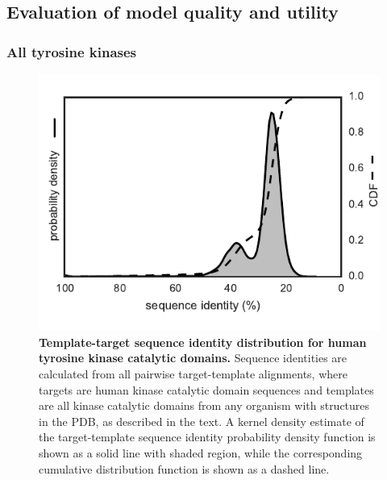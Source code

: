 \documentclass[aps,pre,twocolumn,nofootinbib,superscriptaddress,linenumbers]{revtex4-1}
\begin{document}
\subsection*{Evaluation of model quality and utility}

\subsubsection*{All tyrosine kinases}



\begin{figure}[tb]
    \includegraphics[width=1.0\columnwidth]{seqid_dist/seqid_dist.pdf}

    \caption{{\bf Template-target sequence identity distribution for human tyrosine kinase catalytic domains.}
    Sequence identities are calculated from all pairwise target-template alignments, where targets are human kinase catalytic domain sequences and templates are all kinase catalytic domains from any organism with structures in the PDB, as described in the text.
    A kernel density estimate of the target-template sequence identity probability density function is shown as a solid line with shaded region, while the corresponding cumulative distribution function is shown as a dashed line.
    }
  \label{figure:sequence-identity-distribution}
\end{figure}
\end{document}
